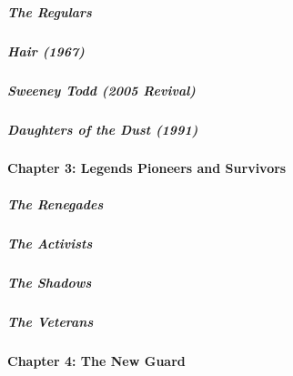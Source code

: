 \href{/interactive/2020/04/13/t-magazine/omen-restaurant-nyc.html}{}

\hypertarget{the-regulars}{%
\subparagraph{The Regulars}\label{the-regulars}}

\href{/interactive/2020/04/13/t-magazine/hair-musical-broadway.html}{}

\hypertarget{hair-1967}{%
\subparagraph{Hair (1967)}\label{hair-1967}}

\href{/interactive/2020/04/13/t-magazine/sweeney-todd-revival.html}{}

\hypertarget{sweeney-todd-2005-revival}{%
\subparagraph{Sweeney Todd (2005
Revival)}\label{sweeney-todd-2005-revival}}

\href{/interactive/2020/04/13/t-magazine/daughters-of-the-dust.html}{}

\hypertarget{daughters-of-the-dust-1991}{%
\subparagraph{Daughters of the Dust
(1991)}\label{daughters-of-the-dust-1991}}

\hypertarget{chapter-3-legends-pioneers-and-survivors}{%
\paragraph{Chapter 3: Legends Pioneers and
Survivors}\label{chapter-3-legends-pioneers-and-survivors}}

\href{/interactive/2020/04/13/t-magazine/butch-stud-lesbian.html}{}

\hypertarget{the-renegades}{%
\subparagraph{The Renegades}\label{the-renegades}}

\href{/interactive/2020/04/13/t-magazine/act-up-aids.html}{}

\hypertarget{the-activists}{%
\subparagraph{The Activists}\label{the-activists}}

\href{/interactive/2020/04/13/t-magazine/artist-recluse.html}{}

\hypertarget{the-shadows}{%
\subparagraph{The Shadows}\label{the-shadows}}

\href{/interactive/2020/04/13/t-magazine/black-actresses-bassett-berry-blige-henson-whitfield-elise.html}{}

\hypertarget{the-veterans}{%
\subparagraph{The Veterans}\label{the-veterans}}

\hypertarget{chapter-4-the-new-guard}{%
\paragraph{Chapter 4: The New Guard}\label{chapter-4-the-new-guard}}

